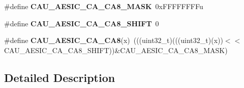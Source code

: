\begin{DoxyCompactItemize}
\item 
\#define {\bfseries C\+A\+U\+\_\+\+A\+E\+S\+I\+C\+\_\+\+C\+A\+\_\+\+C\+A8\+\_\+\+M\+A\+SK}~0x\+F\+F\+F\+F\+F\+F\+F\+Fu\hypertarget{group__CAU__Register__Masks_ga00cb0732940136f8434d5c19c522ebad}{}\label{group__CAU__Register__Masks_ga00cb0732940136f8434d5c19c522ebad}

\item 
\#define {\bfseries C\+A\+U\+\_\+\+A\+E\+S\+I\+C\+\_\+\+C\+A\+\_\+\+C\+A8\+\_\+\+S\+H\+I\+FT}~0\hypertarget{group__CAU__Register__Masks_gaa21e930792a5dae7f0b460040f2fb171}{}\label{group__CAU__Register__Masks_gaa21e930792a5dae7f0b460040f2fb171}

\item 
\#define {\bfseries C\+A\+U\+\_\+\+A\+E\+S\+I\+C\+\_\+\+C\+A\+\_\+\+C\+A8}(x)~(((uint32\+\_\+t)(((uint32\+\_\+t)(x))$<$$<$C\+A\+U\+\_\+\+A\+E\+S\+I\+C\+\_\+\+C\+A\+\_\+\+C\+A8\+\_\+\+S\+H\+I\+FT))\&C\+A\+U\+\_\+\+A\+E\+S\+I\+C\+\_\+\+C\+A\+\_\+\+C\+A8\+\_\+\+M\+A\+SK)\hypertarget{group__CAU__Register__Masks_ga54505996e12003026474a4c0c94696e6}{}\label{group__CAU__Register__Masks_ga54505996e12003026474a4c0c94696e6}

\end{DoxyCompactItemize}


\subsection{Detailed Description}
